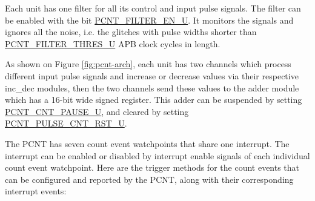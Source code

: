 \documentclass[main\_\_EN.tex]{subfiles}
\begin{document}
Each unit has one filter for all its control and input pulse signals. The filter can be enabled with the bit \hyperref[fielddesc:PCNTFILTERENUN]{PCNT\_FILTER\_EN\_U}. It monitors the signals and ignores all the noise, i.e. the glitches with pulse widths shorter than \hyperref[fielddesc:PCNTFILTERTHRESUN]{PCNT\_FILTER\_THRES\_U} APB clock cycles in length.


As shown on Figure \ref{fig:pcnt-arch}, each unit has two channels which process different input pulse signals and increase or decrease values via their respective inc\_dec modules, then the two channels send these values to the adder module which has a 16-bit wide signed register. This adder can be suspended by setting \hyperref[fielddesc:PCNTCNTPAUSEUN]{PCNT\_CNT\_PAUSE\_U}, and cleared by setting \hyperref[fielddesc:PCNTPULSECNTRSTUN]{PCNT\_PULSE\_CNT\_RST\_U}.

The PCNT has seven count event watchpoints that share one interrupt. The interrupt can be enabled or disabled by interrupt enable signals of each individual count event watchpoint.
Here are the trigger methods for the count events that can be configured and reported by the PCNT, along with their corresponding interrupt events:
\end{document}
